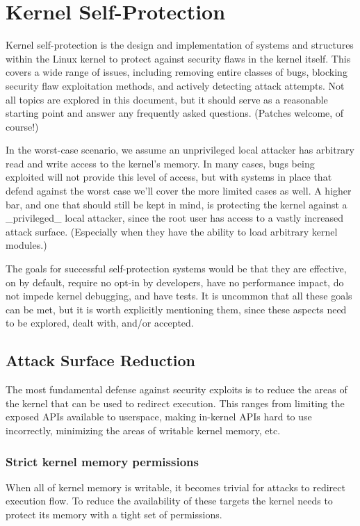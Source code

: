 \documentclass[a4paper,8pt,english]{sphinxmanual}
\begin{document}
\chapter{Kernel Self-Protection}
\label{security/self-protection:kernel-self-protection}\label{security/self-protection::doc}
Kernel self-protection is the design and implementation of systems and
structures within the Linux kernel to protect against security flaws in
the kernel itself. This covers a wide range of issues, including removing
entire classes of bugs, blocking security flaw exploitation methods,
and actively detecting attack attempts. Not all topics are explored in
this document, but it should serve as a reasonable starting point and
answer any frequently asked questions. (Patches welcome, of course!)

In the worst-case scenario, we assume an unprivileged local attacker
has arbitrary read and write access to the kernel's memory. In many
cases, bugs being exploited will not provide this level of access,
but with systems in place that defend against the worst case we'll
cover the more limited cases as well. A higher bar, and one that should
still be kept in mind, is protecting the kernel against a \_privileged\_
local attacker, since the root user has access to a vastly increased
attack surface. (Especially when they have the ability to load arbitrary
kernel modules.)

The goals for successful self-protection systems would be that they
are effective, on by default, require no opt-in by developers, have no
performance impact, do not impede kernel debugging, and have tests. It
is uncommon that all these goals can be met, but it is worth explicitly
mentioning them, since these aspects need to be explored, dealt with,
and/or accepted.


\section{Attack Surface Reduction}
\label{security/self-protection:attack-surface-reduction}
The most fundamental defense against security exploits is to reduce the
areas of the kernel that can be used to redirect execution. This ranges
from limiting the exposed APIs available to userspace, making in-kernel
APIs hard to use incorrectly, minimizing the areas of writable kernel
memory, etc.


\subsection{Strict kernel memory permissions}
\label{security/self-protection:strict-kernel-memory-permissions}
When all of kernel memory is writable, it becomes trivial for attacks
to redirect execution flow. To reduce the availability of these targets
the kernel needs to protect its memory with a tight set of permissions.
\end{document}
